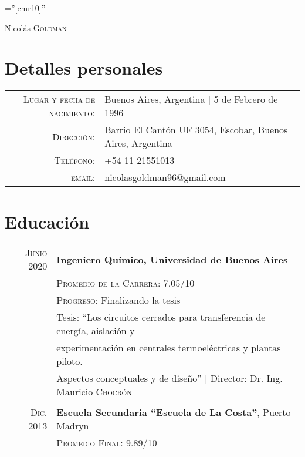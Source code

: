 \documentclass[a4paper,10pt]{article}
\begin{document}

\pagestyle{empty} %

\font\fb=''[cmr10]'' %

\par{\centering
		{\Huge Nicolás \textsc{Goldman}
	}\bigskip\par}

\section{Detalles personales}\smallskip

\begin{tabular}{rl}
    \textsc{Lugar y fecha de nacimiento:} & Buenos Aires, Argentina  | 5 de Febrero de 1996 \\
    \textsc{Dirección:}   & Barrio El Cantón UF 3054, Escobar, Buenos Aires, Argentina \\
    \textsc{Teléfono:}     & +54 11 21551013\\
    \textsc{email:}     & \href{mailto:nicolasgoldman96@gmail.com}{\underline{nicolasgoldman96@gmail.com}}
\end{tabular}

\section{Educación}\smallskip
\begin{tabular}{rl}	
\textsc{Junio} 2020 & \textbf{Ingeniero Químico,  Universidad de Buenos Aires}\\
&\small\textsc{Promedio de la Carrera:} 7.05/10\\
&\small\textsc{Progreso:} Finalizando la tesis  \\
& Tesis: ``Los circuitos cerrados para transferencia de energía, aislación y\\& experimentación en centrales termoeléctricas y plantas piloto.\\& Aspectos conceptuales y de diseño'' | \small Director: Dr. Ing. Mauricio \textsc{Chocrón}\\\\
\textsc{Dic.} 2013& \textbf{Escuela Secundaria ``Escuela de La Costa''}, Puerto Madryn\\ &\small\textsc{Promedio Final:} 9.89/10
\end{tabular}
\end{document}
